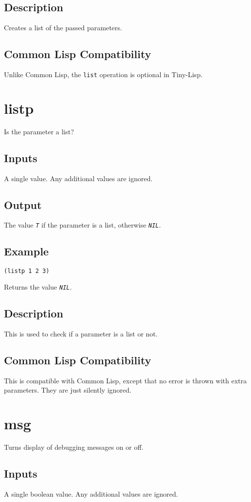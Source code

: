 \documentclass[10pt, openany]{book}
\newcommand{\constant}[1]{\emph{\texttt{#1}}}
\newcommand{\keyword}[1]{\texttt{#1}}
\newcommand{\tl}{Tiny-Lisp}
\newcommand{\cl}{Common Lisp}
\begin{document}
\subsection{Description}
Creates a list of the passed parameters.
\subsection{Common Lisp Compatibility}
Unlike \cl{}, the \keyword{list} operation is optional in \tl{}.

\section{listp}
Is the parameter a list?
\subsection{Inputs}
A single value.  Any additional values are ignored.
\subsection{Output}
The value \constant{T} if the parameter is a list, otherwise \constant{NIL}.
\subsection{Example}
\begin{lstlisting}
(listp 1 2 3)
\end{lstlisting}
Returns the value \constant{NIL}.
\subsection{Description}
This is used to check if a parameter is a list or not.
\subsection{Common Lisp Compatibility}
This is compatible with \cl, except that no error is thrown with extra parameters.  They are just silently ignored.

\section{msg}
Turns display of debugging messages on or off.
\subsection{Inputs}
A single boolean value.  Any additional values are ignored.
\end{document}
